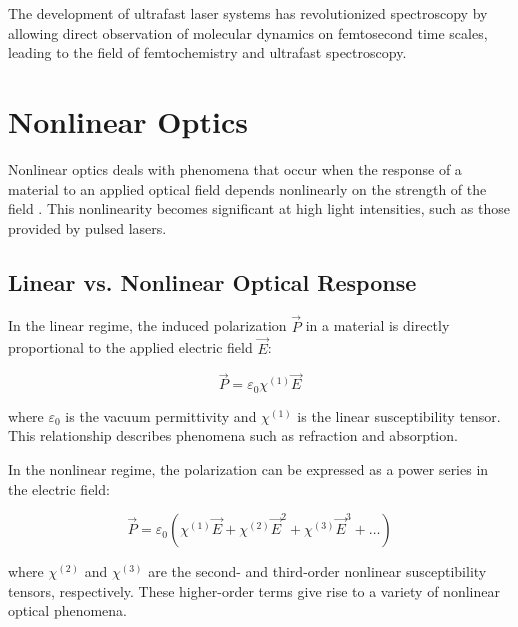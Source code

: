\noindent The development of ultrafast laser systems has revolutionized spectroscopy by allowing direct observation of molecular dynamics on femtosecond time scales, leading to the field of femtochemistry and ultrafast spectroscopy.


\section{Nonlinear Optics}
\label{sec:nonlinear_optics}

\noindent Nonlinear optics deals with phenomena that occur when the response of a material to an applied optical field depends nonlinearly on the strength of the field \cite{Boyd2008}. This nonlinearity becomes significant at high light intensities, such as those provided by pulsed lasers.

\subsection{Linear vs. Nonlinear Optical Response}
\label{subsec:linear_vs_nonlinear}

\noindent In the linear regime, the induced polarization $\vec{P}$ in a material is directly proportional to the applied electric field $\vec{E}$:

\begin{equation}
    \vec{P} = \varepsilon_0 \chi^{(1)} \vec{E}
    \label{eq:linear_polarization}
\end{equation}

\noindent where $\varepsilon_0$ is the vacuum permittivity and $\chi^{(1)}$ is the linear susceptibility tensor. This relationship describes phenomena such as refraction and absorption.

\noindent In the nonlinear regime, the polarization can be expressed as a power series in the electric field:

\begin{equation}
    \vec{P} = \varepsilon_0 (\chi^{(1)} \vec{E} + \chi^{(2)} \vec{E}^2 + \chi^{(3)} \vec{E}^3 + \ldots)
    \label{eq:nonlinear_polarization}
\end{equation}

\noindent where $\chi^{(2)}$ and $\chi^{(3)}$ are the second- and third-order nonlinear susceptibility tensors, respectively. These higher-order terms give rise to a variety of nonlinear optical phenomena.

